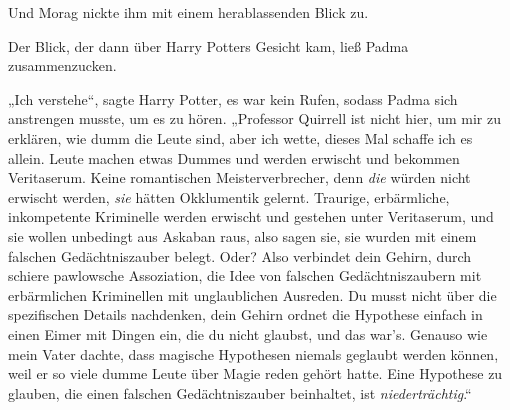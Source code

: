 Und Morag nickte ihm mit einem herablassenden Blick zu.

Der Blick, der dann über Harry Potters Gesicht kam, ließ Padma zusammenzucken.

„Ich verstehe“, sagte Harry Potter, es war kein Rufen, sodass Padma sich anstrengen musste, um es zu hören. „Professor Quirrell ist nicht hier, um mir zu erklären, wie dumm die Leute sind, aber ich wette, dieses Mal schaffe ich es allein. Leute machen etwas Dummes und werden erwischt und bekommen Veritaserum. Keine romantischen Meisterverbrecher, denn \emph{die} würden nicht erwischt werden, \emph{sie} hätten Okklumentik gelernt. Traurige, erbärmliche, inkompetente Kriminelle werden erwischt und gestehen unter Veritaserum, und sie wollen unbedingt aus Askaban raus, also sagen sie, sie wurden mit einem falschen Gedächtniszauber belegt. Oder? Also verbindet dein Gehirn, durch schiere pawlowsche Assoziation, die Idee von falschen Gedächtniszaubern mit erbärmlichen Kriminellen mit unglaublichen Ausreden. Du musst nicht über die spezifischen Details nachdenken, dein Gehirn ordnet die Hypothese einfach in einen Eimer mit Dingen ein, die du nicht glaubst, und das war’s. Genauso wie mein Vater dachte, dass magische Hypothesen niemals geglaubt werden können, weil er so viele dumme Leute über Magie reden gehört hatte. Eine Hypothese zu glauben, die einen falschen Gedächtniszauber beinhaltet, ist \emph{niederträchtig}.“

